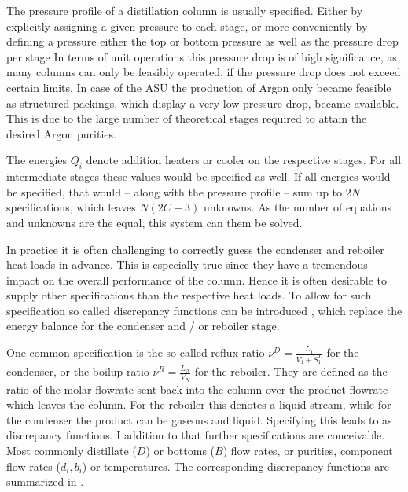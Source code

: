         The pressure profile of a distillation column is usually specified. Either by explicitly
        assigning a given pressure to each stage, or more conveniently by defining a pressure
        either the top or bottom pressure as well as the pressure drop per stage
        In terms of unit operations this pressure drop is of high significance,
        as many columns can only be feasibly operated, if the pressure drop does not exceed certain
        limits. In case of the ASU the production of Argon only became feasible as structured
        packings, which display a very low pressure drop, became available. This is due to the large
        number of theoretical stages required to attain the desired Argon purities.

        The energies $Q_i$ denote addition heaters or cooler on the respective stages. For all
        intermediate stages these values would be specified as well. If all energies would be
        specified, that would -- along with the pressure profile -- sum up to $2N$ specifications,
        which leaves $N (2C + 3)$ unknowns. As the number of equations and unknowns are the equal,
        this system can them be solved.

        In practice it is often challenging to correctly guess the condenser and reboiler heat loads in
        advance. This is especially true since they have a tremendous impact on the overall performance
        of the column. Hence it is often desirable to supply other specifications than the respective
        heat loads. To allow for such specification so called discrepancy functions can be introduced \cite{Henley.op.2011},
        which replace the energy balance for the condenser and / or reboiler stage.

        One common specification is the so called reflux ratio $\nu^D = \frac{L_1}{V_1 + S_1^L}$ for
        the condenser, or the boilup ratio $\nu^R = \frac{L_N}{V_N}$ for the reboiler.
        They are defined as the ratio of the molar flowrate sent back into the column over the
        product flowrate which leaves the column. For the reboiler this denotes a liquid stream,
        while for the condenser the product can be gaseous and liquid. Specifying this leads to
        as discrepancy functions. I addition to that further specifications are conceivable. Most
        commonly distillate ($D$) or bottoms ($B$) flow rates, or purities, component flow rates ($d_i, b_i$)
        or temperatures. The corresponding discrepancy functions are summarized in .

